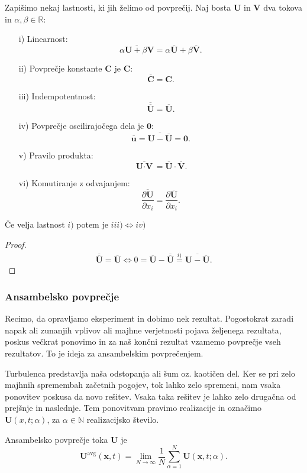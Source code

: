 \documentclass[mat2, tisk]{fmfdelo}
\newcommand{\R}{\mathbb R}
\newcommand{\N}{\mathbb N}
\newcommand{\bd}{\textbf}
\begin{document}
Zapišimo nekaj lastnosti, ki jih želimo od povprečij. Naj bosta $\bd{U}$ in $\bd{V}$ dva tokova in 
$\alpha, \beta \in \R$:
\begin{enumerate}
  \item[i)] Linearnost: 
  $$\overline{\alpha \bd{U} + \beta \bd{V}} = \alpha \overline{\bd{U}} + \beta\overline{\bd{V}}.$$
  \item[ii)] Povprečje konstante $\bd{C}$ je $\bd{C}$:
  $$ \overline{\bd{C}} = \bd{C}.$$
  \item[iii)] Indempotentnost:
  $$ \overline{\overline{\bd{U}}} = \overline{\bd{U}}.$$
  \item[iv)] Povprečje oscilirajočega dela je $\bd{0}$:
  $$ \overline{\bd{u}} = \overline{\bd{U} - \overline{\bd{U}}} = \bd{0}.$$
  \item[v)] Pravilo produkta: 
  $$ \overline{\bd{U}\cdot \bd{V}} = \overline{\bd{U}}\cdot \overline{\bd{V}}. $$
  \item[vi)] Komutiranje z odvajanjem:
  $$ \overline{\frac{\partial \bd{U}}{\partial x_i}} = \frac{\partial \overline{\bd{U}}}{\partial x_i}.$$
\end{enumerate}

\begin{lema}
Če velja lastnost $i)$ potem je $iii) \iff iv)$
\end{lema}

\begin{proof}
\begin{align*}
\overline{\overline{\bd{U}}} = \overline{\bd{U}} \iff 0 = \overline{\bd{U}} - \overline{\overline{\bd{U}}} \stackrel{i)}{=} 
\overline{\bd{U} - \overline{\bd{U}}}.
\end{align*}
\end{proof}

\subsubsection{Ansambelsko povprečje}
Recimo, da opravljamo eksperiment in dobimo nek rezultat. Pogostokrat zaradi napak ali 
zunanjih vplivov ali majhne verjetnosti pojava željenega rezultata, poskus večkrat ponovimo in 
za naš končni rezultat vzamemo povprečje vseh rezultatov. To je ideja za ansambelskim 
povprečenjem.

Turbulenca predstavlja naša odstopanja ali šum oz. kaotičen del.
Ker se pri zelo majhnih spremembah začetnih pogojev, tok lahko zelo spremeni, nam vsaka ponovitev 
poskusa da novo rešitev. Vsaka taka rešitev je lahko zelo drugačna od prejšnje in naslednje. 
Tem ponovitvam pravimo realizacije in označimo $\bd{U}(x, t; \alpha)$, za $\alpha \in \N$
realizacijsko število. 
\begin{definicija}
Ansambelsko povprečje toka $\bd{U}$ je 
\begin{equation}
\bd{U}^\text{avg}(\bd{x}, t) = \lim_{N\rightarrow \infty} \frac{1}{N}\sum_{\alpha=1}^N \bd{U}(\bd{x}, t;\alpha). 
\end{equation}
\end{definicija}
\end{document}
